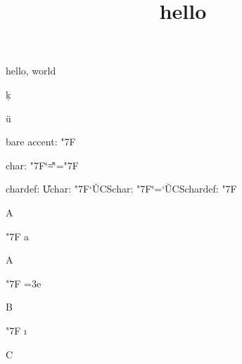 \documentclass{amsart}
\title{hello}
\begin{document}
\maketitle

hello, world

\c k

\"u

bare accent: \accent"7F

char: \accent"7F\char`\u

\chardef\U=`\u
\chardef\D="7F

chardef: \accent\D\U

Uchar: \accent"7F\Uchar`\u

UCSchar: \accent"7F\UCSchar`\u

\UCSchardef\X=`\u

UCSchardef: \accent"7F\X

\newcount\Y

\def\X{A}


\X\the\Y

\accent"7F  a

\X\the\Y

\accent"7F \def\X{B} \Y=3e

\X\the\Y

\accent"7F \def\X{C}  \i

\X\the\Y
\end{document}
